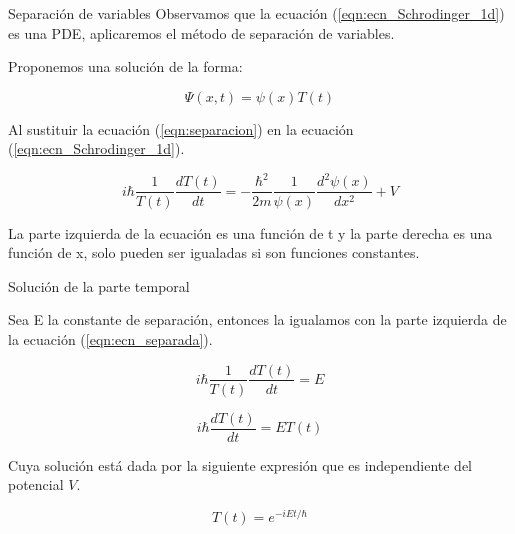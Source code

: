 \begin{frame}{Separación de variables}
    Observamos que la ecuación (\ref{eqn:ecn_Schrodinger_1d}) es una PDE, aplicaremos el método de separación de variables. 
    
    \vspace{0.2cm}
    
    Proponemos una solución de la forma:

    \begin{equation}
        \Psi(x, t) = \psi(x) T(t)
        \label{eqn:separacion}
    \end{equation}

    Al sustituir la ecuación (\ref{eqn:separacion}) en la ecuación (\ref{eqn:ecn_Schrodinger_1d}).

    \begin{equation}
        i \hbar \frac{1}{T(t)} \frac{dT(t)}{dt}
        =
        - \frac{\hbar^2}{2m} \frac{1}{\psi(x)} \frac{d^2\psi(x)}{dx^2} + V
        \label{eqn:ecn_separada}
    \end{equation}

    La parte izquierda de la ecuación es una función de t y la parte derecha es una función de x, solo pueden ser igualadas si son funciones constantes.

\end{frame}

\begin{frame}{Solución de la parte temporal}
    
    Sea E la constante de separación, entonces la igualamos con la parte izquierda de la
    ecuación (\ref{eqn:ecn_separada}).

    \begin{equation}
        i \hbar \frac{1}{T(t)} \frac{dT(t)}{dt}
        =
        E
    \end{equation}

    \begin{equation}
        i \hbar \frac{dT(t)}{dt}
        =
        E T(t)
    \end{equation}

    Cuya solución está dada por la siguiente expresión que es independiente del potencial $V$.

    \begin{equation}
        T(t) = e^{-iEt/\hbar}
    \end{equation}

\end{frame}


